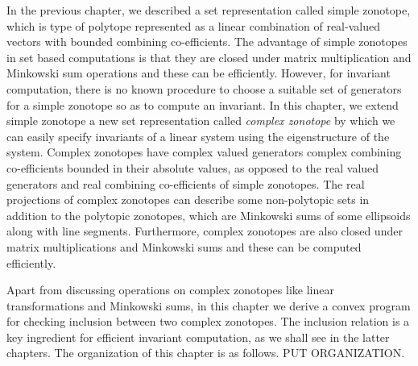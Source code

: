 In the previous chapter, we described a set representation called
simple zonotope, which is type of polytope represented as a linear
combination of real-valued vectors with bounded combining
co-efficients.  The advantage of simple zonotopes in set based
computations is that they are closed under matrix multiplication and
Minkowski sum operations and these can be efficiently.  However, for
invariant computation, there is no known procedure to choose a
suitable set of generators for a simple zonotope so as to compute an
invariant.  In this chapter, we extend simple zonotope a new set
representation called \emph{complex zonotope} by which we can easily
specify invariants of a linear system using the eigenstructure of the
system.  Complex zonotopes have complex valued generators complex
combining co-efficients bounded in their absolute values, as opposed
to the real valued generators and real combining co-efficients of
simple zonotopes.  The real projections of complex zonotopes can
describe some non-polytopic sets in addition to the polytopic  
zonotopes, which are Minkowski sums of some ellipsoids along with line
segments.  Furthermore, complex zonotopes are also closed under matrix
multiplications and Minkowski sums and these can be computed
efficiently.

Apart from discussing operations on complex zonotopes like linear
transformations and Minkowski sums, in this chapter we derive a convex
program for checking inclusion between two complex zonotopes.  The
inclusion relation is a key ingredient for efficient invariant
computation, as we shall see in the latter chapters.  The organization
of this chapter is as follows.  PUT ORGANIZATION.

